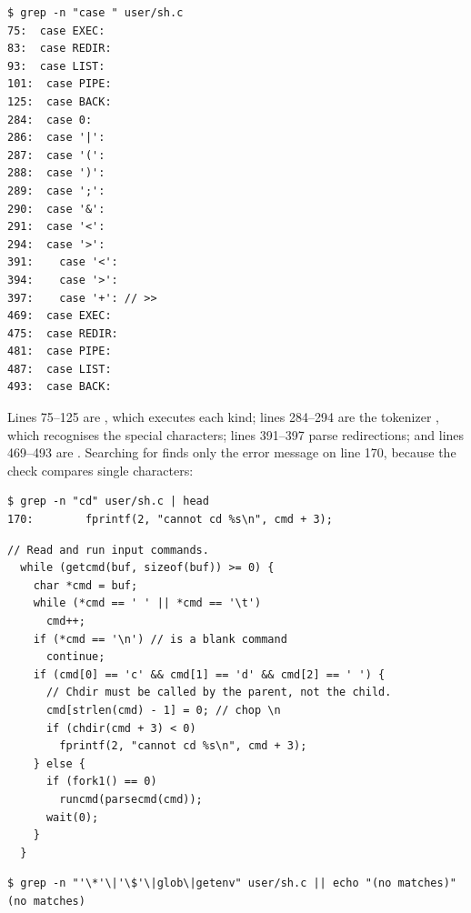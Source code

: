 \documentclass[11pt,a4paper]{article}
\begin{document}
\begin{lstlisting}[caption={Where each kind is run}]
$ grep -n "case " user/sh.c
75:  case EXEC:
83:  case REDIR:
93:  case LIST:
101:  case PIPE:
125:  case BACK:
284:  case 0:
286:  case '|':
287:  case '(':
288:  case ')':
289:  case ';':
290:  case '&':
291:  case '<':
294:  case '>':
391:    case '<':
394:    case '>':
397:    case '+': // >>
469:  case EXEC:
475:  case REDIR:
481:  case PIPE:
487:  case LIST:
493:  case BACK:
\end{lstlisting}

Lines 75--125 are , which executes each kind; lines 284--294 are the tokenizer
, which recognises the special characters; lines 391--397 parse
redirections; and lines 469--493 are . Searching for  finds only
the error message on line 170, because the check compares single characters:

\begin{lstlisting}
$ grep -n "cd" user/sh.c | head
170:        fprintf(2, "cannot cd %s\n", cmd + 3);
\end{lstlisting}

\begin{lstlisting}[style=ccode,firstnumber=159,caption={The code that handles cd}]
  // Read and run input commands.
  while (getcmd(buf, sizeof(buf)) >= 0) {
    char *cmd = buf;
    while (*cmd == ' ' || *cmd == '\t')
      cmd++;
    if (*cmd == '\n') // is a blank command
      continue;
    if (cmd[0] == 'c' && cmd[1] == 'd' && cmd[2] == ' ') {
      // Chdir must be called by the parent, not the child.
      cmd[strlen(cmd) - 1] = 0; // chop \n
      if (chdir(cmd + 3) < 0)
        fprintf(2, "cannot cd %s\n", cmd + 3);
    } else {
      if (fork1() == 0)
        runcmd(parsecmd(cmd));
      wait(0);
    }
  }
\end{lstlisting}

\begin{lstlisting}[caption={Searching sh.c for code that handles * or \$}]
$ grep -n "'\*'\|'\$'\|glob\|getenv" user/sh.c || echo "(no matches)"
(no matches)
\end{lstlisting}
\end{document}
